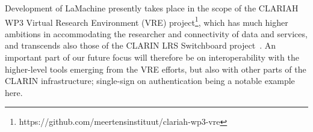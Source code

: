\documentclass[a4paper,11pt]{article}
\begin{document}
Development of LaMachine presently takes place in the scope of the CLARIAH WP3 Virtual Research Environment (VRE)
project\footnote{https://github.com/meertensinstituut/clariah-wp3-vre}, which has much higher ambitions in accommodating
the researcher and connectivity of data and services, and transcends also those of the CLARIN LRS Switchboard
project~\cite{switchboard}. An important part of our future focus will therefore be on interoperability with the
higher-level tools emerging from the VRE efforts, but also with other parts of the CLARIN infrastructure; single-sign on
authentication being a notable example here.



\end{document}
